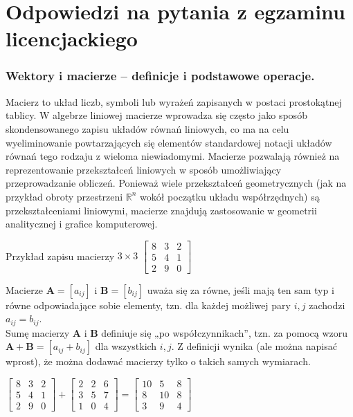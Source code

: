\documentclass[a4paper,12pt,oneside]{book}
\begin{document}
	\chapter*{Odpowiedzi na pytania z egzaminu licencjackiego}
	\subsection{Wektory i macierze – definicje i podstawowe operacje.}
	
	Macierz to układ liczb, symboli lub wyrażeń zapisanych w postaci prostokątnej tablicy. W algebrze liniowej macierze wprowadza się często jako sposób skondensowanego zapisu układów równań liniowych, co ma na celu wyeliminowanie powtarzających się elementów standardowej notacji układów równań tego rodzaju z wieloma niewiadomymi. Macierze pozwalają również na reprezentowanie przekształceń liniowych w sposób umożliwiający przeprowadzanie obliczeń. Ponieważ wiele przekształceń geometrycznych (jak na przykład obroty przestrzeni $\mathbb {R} ^{n}$ wokół początku układu współrzędnych) są przekształceniami liniowymi, macierze znajdują zastosowanie w geometrii analitycznej i grafice komputerowej.
	
	Przykład zapisu macierzy $3\times 3$
	$ \begin{bmatrix}
		8 & 3 & 2 \\
		5 & 4 & 1 \\
		2 & 9 & 0 
	\end{bmatrix}  $
	
	Macierze ${\displaystyle \mathbf {A} =[a_{ij}]}$ i ${\displaystyle \mathbf {B} =[b_{ij}]}$ uważa się za równe, jeśli mają ten sam typ i równe odpowiadające sobie elementy, tzn. dla każdej możliwej pary $i,j$ zachodzi ${\displaystyle a_{ij}=b_{ij}.}$\\
	
	Sumę macierzy $\mathbf{A}$ i $\mathbf{B}$ definiuje się „po współczynnikach”, tzn. za pomocą wzoru $\mathbf {A+B} =[a_{ij}+b_{ij}]$ dla wszystkich $i,j.$ Z definicji wynika (ale można napisać wprost), że można dodawać macierzy tylko o takich samych wymiarach.
	
	\begin{center}
		$ \begin{bmatrix}
			8 & 3 & 2 \\
			5 & 4 & 1 \\
			2 & 9 & 0 
		\end{bmatrix} + 
	\begin{bmatrix}
		2 & 2 & 6 \\
		3 & 5 & 7 \\
		1 & 0 & 4 
	\end{bmatrix} = 
\begin{bmatrix}
	10 & 5 & 8 \\
	8 & 10 & 8 \\
	3 & 9 & 4 
\end{bmatrix}$
	\end{center}
	
\end{document}
